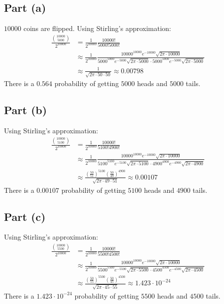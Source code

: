 \documentclass{article}
\begin{document}
\clearpage

\problem
\subsection*{Part (a)}
$10000$ coins are flipped. Using Stirling's approximation:
\begin{equation}
    \begin{split}
        \frac{{10000 \choose 5000}}{2^{10000}} & = \frac{1}{2^{10000}}\frac{10000!}{5000!5000!} \\
        & \approx \frac{1}{2^{10000}}\frac{10000^{10000}e^{-10000}\sqrt{2\pi \cdot 10000}}{5000^{5000}e^{-5000}\sqrt{2\pi \cdot 5000} \cdot 5000^{5000}e^{-5000}\sqrt{2\pi \cdot 5000}} \\
        & \approx \frac{1}{\sqrt{2\pi \cdot 50 \cdot 50}} \approx 0.00798
    \end{split}
\end{equation}
There is a $0.564$ probability of getting $5000$ heads and $5000$ tails.
\subsection*{Part (b)}
Using Stirling's approximation:
\begin{equation}
    \begin{split}
        \frac{{10000 \choose 5100}}{2^{10000}} & = \frac{1}{2^{10000}}\frac{10000!}{5100!4900!} \\
        & \approx \frac{1}{2^{10000}}\frac{10000^{10000}e^{-10000}\sqrt{2\pi \cdot 10000}}{5100^{5100}e^{-5100}\sqrt{2\pi \cdot 5100} \cdot 4900^{4900}e^{-4900}\sqrt{2\pi \cdot 4900}} \\
        & \approx \frac{{\left(\frac{50}{51}\right)}^{5100}(\frac{50}{49})^{4900}}{\sqrt{2\pi \cdot 49 \cdot 51}} \approx 0.00107
    \end{split}
\end{equation}
There is a $0.00107$ probability of getting $5100$ heads and $4900$ tails.
\subsection*{Part (c)}
Using Stirling's approximation:
\begin{equation}
    \begin{split}
        \frac{{10000 \choose 5500}}{2^{10000}} & = \frac{1}{2^{10000}}\frac{10000!}{5500!4500!} \\
        & \approx \frac{1}{2^{10000}}\frac{10000^{10000}e^{-10000}\sqrt{2\pi \cdot 10000}}{5500^{5500}e^{-5500}\sqrt{2\pi \cdot 5500} \cdot 4500^{4500}e^{-4500}\sqrt{2\pi \cdot 4500}} \\
        & \approx \frac{{\left(\frac{50}{55}\right)}^{5500}(\frac{50}{45})^{4500}}{\sqrt{2\pi \cdot 45 \cdot 55}} \approx 1.423 \cdot 10^{-24}
    \end{split}
\end{equation}
There is a $1.423 \cdot 10^{-24}$ probability of getting $5500$ heads and $4500$ tails.
\end{document}
